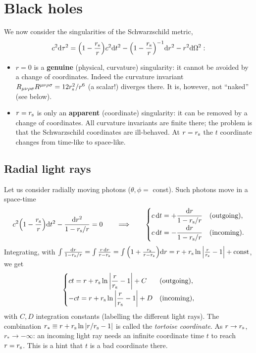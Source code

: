 \chapter{Black holes}\label{ch:blackholes}

We now consider the singularities of the Schwarzschild metric,
\[
  c^2\mathrm{d}\tau^2=\Big(1-\frac{r_{\mathrm s}} r\Big)c^2\mathrm{d} t^2-\Big(1-\frac{r_{\mathrm s}} r\Big)^{-1}\mathrm{d} r^2-r^2\mathrm{d}\Omega^2 :
\]
\begin{itemize}[nosep]
\item $r=0$ is a \textbf{genuine} (physical, curvature) singularity: it cannot be avoided by a change of coordinates. Indeed the curvature invariant $R_{\mu\nu\rho\sigma}R^{\mu\nu\rho\sigma}=12r_{\mathrm s}^2/r^6$ (a scalar!) diverges there. It is, however, not ``naked'' (see below).
\item $r=r_{\mathrm s}$ is only an \textbf{apparent} (coordinate) singularity: it can be removed by a change of coordinates. All curvature invariants are finite there; the problem is that the Schwarzschild coordinates are ill-behaved. At $r=r_{\mathrm s}$ the $t$ coordinate changes from time-like to space-like.
\end{itemize}

\section{Radial light rays}

Let us consider radially moving photons ($\theta,\phi=$ const). Such photons move in a space-time
\[
  c^2\Big(1-\frac{r_{\mathrm s}} r\Big)\mathrm{d} t^2-\frac{\mathrm{d} r^2}{1-r_{\mathrm s}/r}=0\qquad\Longrightarrow\qquad
  \begin{cases}c\,\mathrm{d} t=+\dfrac{\mathrm{d} r}{1-r_{\mathrm s}/r}&\text{(outgoing)},\\[1.5ex] c\,\mathrm{d} t=-\dfrac{\mathrm{d} r}{1-r_{\mathrm s}/r}&\text{(incoming)}.\end{cases}
\]
Integrating, with $\int\frac{\mathrm{d} r}{1-r_{\mathrm s}/r}=\int\frac{r\,\mathrm{d} r}{r-r_{\mathrm s}}=\int\Big(1+\frac{r_{\mathrm s}}{r-r_{\mathrm s}}\Big)\mathrm{d} r=r+r_{\mathrm s}\ln\Big|\frac r{r_{\mathrm s}}-1\Big|+\text{const}$, we get
\begin{equation}
  \begin{cases} ct=r+r_{\mathrm s}\ln\left|\dfrac r{r_{\mathrm s}}-1\right|+C &\text{(outgoing)},\\[1.5ex] -ct=r+r_{\mathrm s}\ln\left|\dfrac r{r_{\mathrm s}}-1\right|+D &\text{(incoming)},\end{cases}
\end{equation}
with $C,D$ integration constants (labelling the different light rays). The combination $r_*\equiv r+r_{\mathrm s}\ln|r/r_{\mathrm s}-1|$ is called the \emph{tortoise coordinate}. As $r\to r_{\mathrm s}$, $r_*\to-\infty$: an incoming light ray needs an infinite coordinate time $t$ to reach $r=r_{\mathrm s}$. This is a hint that $t$ is a bad coordinate there.

